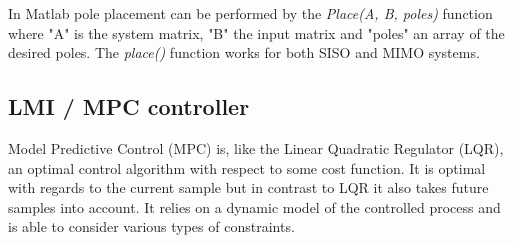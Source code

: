 %

In Matlab pole placement can be performed by the \textit{Place(A, B, poles)} function where "A" is the system matrix, "B" the input matrix and "poles" an array of the desired poles. The \textit{place()} function works for both SISO and MIMO systems.






\subsection{LMI / MPC controller}
Model Predictive Control (MPC) is, like the Linear Quadratic Regulator (LQR), an optimal control algorithm with respect to some cost function. It is optimal with regards to the current sample but in contrast to LQR it also takes future samples into account. It relies on a dynamic model of the controlled process and is able to consider various types of constraints.\\

